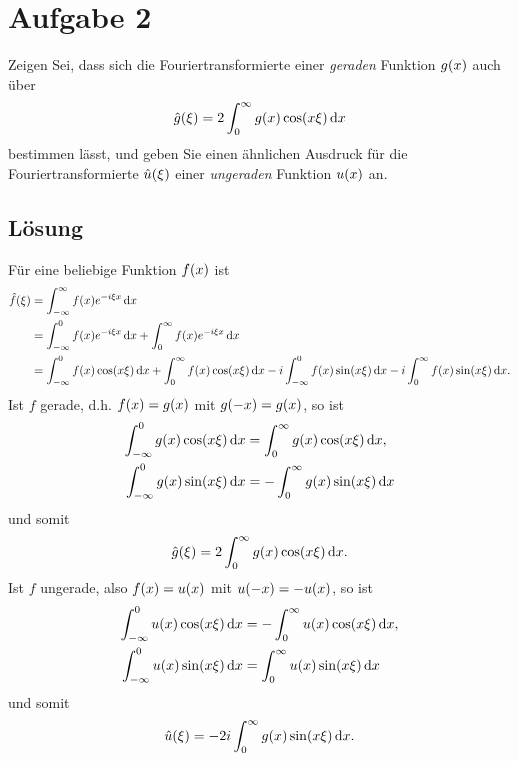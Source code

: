 \documentclass{exercise}
\begin{document}
    \section*{Aufgabe 2}
    
    \begin{problem}
        Zeigen Sei, dass sich die Fouriertransformierte einer \emph{geraden} Funktion \(g\parentheses*{x}\) auch über
        \[
            \hat{g}\parentheses*{\xi} = 2\int_0^\infty g\parentheses*{x}\cos\parentheses*{x\xi}\d x
        \]
        bestimmen lässt, und geben Sie einen ähnlichen Ausdruck für die Fouriertransformierte \(\hat{u}\parentheses*{\xi}\) einer \emph{ungeraden} Funktion \(u\parentheses*{x}\) an.
    \end{problem}
    
    \subsection*{Lösung}
    Für eine beliebige Funktion \(f\parentheses*{x}\) ist
    \begin{align*}
        \hat{f}\parentheses*{\xi} &= \int_{-\infty}^\infty f\parentheses*{x}e^{-i\xi x}\d x\\
        &= \int_{-\infty}^0 f\parentheses*{x}e^{-i\xi x}\d x + \int_0^\infty f\parentheses*{x}e^{-i\xi x}\d x\\
        &= \int_{-\infty}^0 f\parentheses*{x}\cos\parentheses*{x\xi}\d x + \int_0^\infty f\parentheses*{x}\cos\parentheses*{x\xi}\d x - i\int_{-\infty}^0 f\parentheses*{x}\sin\parentheses*{x\xi}\d x - i\int_0^\infty f\parentheses*{x}\sin\parentheses*{x\xi}\d x.
    \end{align*}
    Ist \(f\) gerade, d.h. \(f\parentheses*{x} = g\parentheses*{x}\) mit \(g\parentheses*{-x} = g\parentheses*{x}\), so ist
    \begin{align*}
        \int_{-\infty}^0 g\parentheses*{x}\cos\parentheses*{x\xi}\d x &= \int_0^\infty g\parentheses*{x}\cos\parentheses*{x\xi}\d x,\\
        \int_{-\infty}^0 g\parentheses*{x}\sin\parentheses*{x\xi}\d x &= -\int_0^\infty g\parentheses*{x}\sin\parentheses*{x\xi}\d x
    \end{align*}
    und somit
    \[
        \hat{g}\parentheses*{\xi} = 2\int_0^\infty g\parentheses*{x}\cos\parentheses*{x\xi}\d x.
    \]
    Ist \(f\) ungerade, also \(f\parentheses*{x} = u\parentheses*{x}\) mit \(u\parentheses*{-x} = -u\parentheses*{x}\), so ist
    \begin{align*}
        \int_{-\infty}^0 u\parentheses*{x}\cos\parentheses*{x\xi}\d x &= -\int_0^\infty u\parentheses*{x}\cos\parentheses*{x\xi}\d x,\\
        \int_{-\infty}^0 u\parentheses*{x}\sin\parentheses*{x\xi}\d x &= \int_0^\infty u\parentheses*{x}\sin\parentheses*{x\xi}\d x
    \end{align*}
    und somit
    \[
        \hat{u}\parentheses*{\xi} = -2i\int_0^\infty g\parentheses*{x}\sin\parentheses*{x\xi}\d x.
    \]
\end{document}
